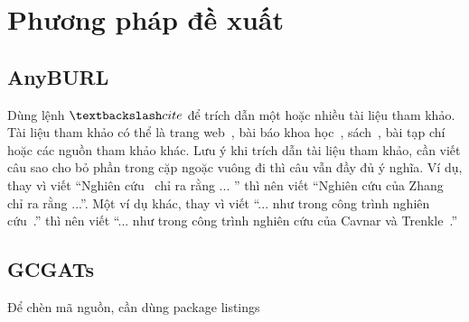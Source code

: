 \chapter{Phương pháp đề xuất}
\label{approachs}

\section{AnyBURL}

Dùng lệnh $\textbackslash cite$ để trích dẫn một hoặc nhiều tài liệu tham khảo.
Tài liệu tham khảo có thể là trang web~\cite{Listings,HDLVThS}, bài báo khoa học~\cite{1994-Cavnar}, sách~\cite{1984-TeX-Knuth,2006-DDien,2006-NPTV}, bài tạp chí~\cite{1989-TED} hoặc các nguồn tham khảo khác. 
Lưu ý khi trích dẫn tài liệu tham khảo, cần viết câu sao cho bỏ phần trong cặp ngoặc vuông đi thì câu vẫn đầy đủ ý nghĩa.
Ví dụ, thay vì viết ``Nghiên cứu~\cite{1989-TED} chỉ ra rằng ... '' thì nên viết ``Nghiên cứu của Zhang~\cite{1989-TED} chỉ ra rằng ...''.
Một ví dụ khác, thay vì viết ``... như trong công trình nghiên cứu~\cite{1994-Cavnar}.'' thì nên viết ``... như trong công trình nghiên cứu của Cavnar và Trenkle~\cite{1994-Cavnar}.''

\section{GCGATs}

Để chèn mã nguồn, cần dùng package listings
